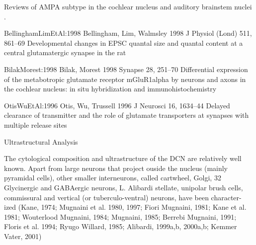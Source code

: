 





\citep{RamanZhangEtAl:1994}
\citep{FrisinaWaltonEtAl:1993,FrisinaSmithEtAl:1990}

\citep{JosephsonMorest:2003,BellinghamLimEtAl:1998,BilakMorest:1998,HunterPetraliaEtAl:1993}

Reviews of AMPA subtype in the cochlear nucleus and auditory brainstem nuclei
\citep{GardnerTrussellEtAl:2001,Parks:2000}.

BellinghamLimEtAl:1998
     Bellingham, Lim, Walmsley      1998 J Physiol (Lond) 511, 861--69
     Developmental changes in {EPSC} quantal size and quantal content at a central glutamatergic synapse in the rat

BilakMorest:1998
     Bilak, Morest                  1998 Synapse 28, 251--70
     Differential expression of the metabotropic glutamate receptor {mGluR1alpha} by neurons and axons in the cochlear nucleus: in situ hybridization and immunohistochemistry

OtisWuEtAl:1996
     Otis, Wu, Trussell             1996 J Neurosci 16, 1634--44
     Delayed clearance of transmitter and the role of glutamate transporters at synapses with multiple release sites


Ultrastructural Analysis

The cytological composition and ultrastructure of the
DCN are relatively well known. Apart from large neurons
that project ouside the nucleus (mainly pyramidal cells),
other smaller interneurons, called cartwheel, Golgi,
32 Glycinergic and GABAergic neurons, L. Alibardi
stellate, unipolar brush cells, commissural and vertical
(or tuberculo-ventral) neurons, have been character-
ized (Kane, 1974; Mugnaini et al. 1980, 1997; Fiori
 Mugnaini, 1981; Kane et al. 1981; Wouterlood 
Mugnaini, 1984; Mugnaini, 1985; Berrebi  Mugnaini,
1991; Floris et al. 1994; Ryugo  Willard, 1985; Alibardi,
1999a,b, 2000a,b; Kemmer  Vater, 2001)



